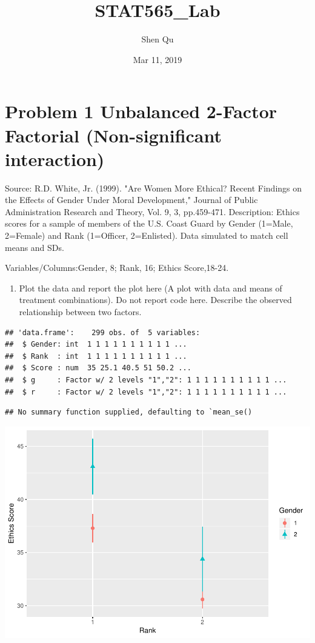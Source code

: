 \documentclass[]{article}
\title{STAT565\_Lab}
\author{Shen Qu}
\date{Mar 11, 2019}
\providecommand{\tightlist}{%
  \setlength{\itemsep}{0pt}\setlength{\parskip}{0pt}}
\begin{document}
\maketitle

\hypertarget{problem-1-unbalanced-2-factor-factorial-non-significant-interaction}{%
\section{Problem 1 Unbalanced 2-Factor Factorial (Non-significant
interaction)}\label{problem-1-unbalanced-2-factor-factorial-non-significant-interaction}}

\textcolor[rgb]{0.5,0.5,0.5}{Source: R.D. White, Jr. (1999). "Are Women More Ethical? Recent Findings on the Effects of Gender Under Moral Development," Journal of Public Administration Research and Theory, Vol. 9, 3, pp.459-471. Description: Ethics scores for a sample of members of the U.S. Coast Guard by Gender (1=Male, 2=Female) and Rank (1=Officer, 2=Enlisted). Data simulated to match cell means and SDs.}

\textcolor[rgb]{0.5,0.5,0.5}{Variables/Columns:Gender, 8; Rank, 16; Ethics Score,18-24.}

\begin{enumerate}
\def\labelenumi{(\alph{enumi})}
\tightlist
\item
  \textcolor[rgb]{0.5,0.5,0.5}{Plot the data and report the plot here (A plot with data and means of treatment combinations). Do not report code here. Describe the observed relationship between two factors.}
\end{enumerate}

\begin{verbatim}
## 'data.frame':    299 obs. of  5 variables:
##  $ Gender: int  1 1 1 1 1 1 1 1 1 1 ...
##  $ Rank  : int  1 1 1 1 1 1 1 1 1 1 ...
##  $ Score : num  35 25.1 40.5 51 50.2 ...
##  $ g     : Factor w/ 2 levels "1","2": 1 1 1 1 1 1 1 1 1 1 ...
##  $ r     : Factor w/ 2 levels "1","2": 1 1 1 1 1 1 1 1 1 1 ...
\end{verbatim}

\begin{verbatim}
## No summary function supplied, defaulting to `mean_se()
\end{verbatim}

\includegraphics[width=0.3\linewidth]{lab7_stat565_files/figure-latex/unnamed-chunk-3-1}
\end{document}

